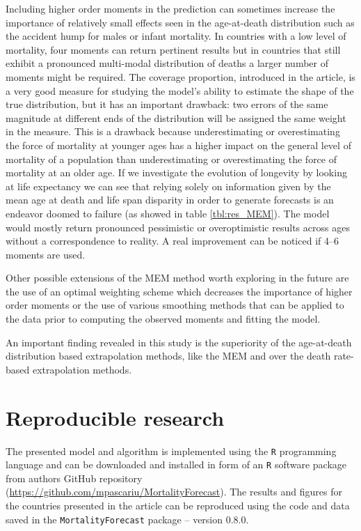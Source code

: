 \documentclass[T0_MEM]{subfiles}
\begin{document}
Including higher order moments in the prediction can sometimes increase the importance of relatively small effects seen in the age-at-death distribution such as the accident hump for males or infant mortality. In countries with a low level of mortality, four moments can return pertinent results but in countries that still exhibit a pronounced multi-modal distribution of deaths a larger number of moments might be required. The coverage proportion, introduced in the article, is a very good measure for studying the model’s ability to estimate the shape of the true distribution, but it has an important drawback: two errors of the same magnitude at different ends of the distribution will be assigned the same weight in the measure. This is a drawback because underestimating or overestimating the force of mortality at younger ages has a higher impact on the general level of mortality of a population than underestimating or overestimating the force of mortality at an older age. If we investigate the evolution of longevity by looking at life expectancy we can see that relying solely on information given by the mean age at death and life span disparity in order to generate forecasts is an endeavor doomed to failure (as showed in table \ref{tbl:res_MEM}). The model would mostly return pronounced pessimistic or overoptimistic results across ages without a correspondence to reality. A real improvement can be noticed if 4--6 moments are used.

Other possible extensions of the MEM method worth exploring in the future are the use of an optimal weighting scheme which decreases the importance of higher order moments or the use of various smoothing methods that can be applied to the data prior to computing the observed moments and fitting the model.

An important finding revealed in this study is the superiority of the age-at-death distribution based extrapolation methods, like the MEM and \cite{oeppen2008} over the death rate-based extrapolation methods.


\section*{Reproducible research}
The presented model and algorithm is implemented using the \texttt{R} programming language \citep{team2018r} and can be downloaded and installed in form of an \texttt{R} software package from authors GitHub repository (\url{https://github.com/mpascariu/MortalityForecast}). The results and figures for the countries presented in the article can be reproduced using the code and data saved in the \texttt{MortalityForecast} package -- version 0.8.0.
\end{document}
